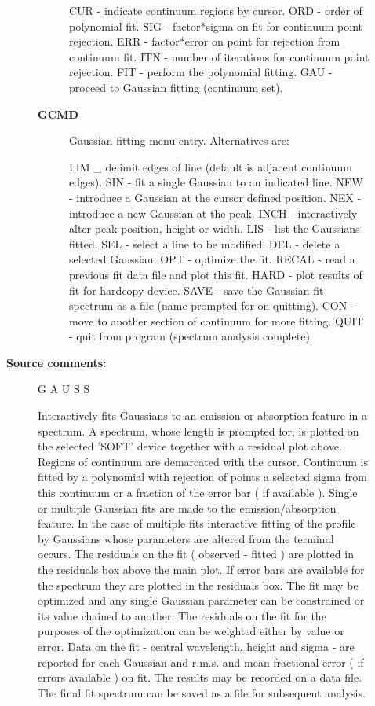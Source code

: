 \begin{description}
\begin{description}
\begin{description}
    CUR - indicate continuum regions by cursor.
    ORD - order of polynomial fit.
    SIG - factor*sigma on fit for continuum point rejection.
    ERR - factor*error on point for rejection from continuum fit.
    ITN - number of iterations for continuum point rejection.
    FIT - perform the polynomial fitting.
    GAU - proceed to Gaussian fitting (continuum set).
\item [\textbf{GCMD}]
 Gaussian fitting menu entry. Alternatives are:

    LIM   \_ delimit edges of line (default is adjacent
            continuum edges).
    SIN   - fit a single Gaussian to an indicated line.
    NEW   - introduce a Gaussian at the cursor defined
            position.
    NEX   - introduce a new Gaussian at the peak.
    INCH  - interactively alter peak position, height or
            width.
    LIS   - list the Gaussians fitted.
    SEL   - select a line to be modified.
    DEL   - delete a selected Gaussian.
    OPT   - optimize the fit.
    RECAL - read a previous fit data file and plot this fit.
    HARD  - plot results of fit for hardcopy device.
    SAVE  - save the Gaussian fit spectrum as a file (name
            prompted for on quitting).
    CON   - move to another section of continuum for more
            fitting.
    QUIT  - quit from program (spectrum analysis complete).
\end{description}

\item [\textbf{Source comments:}]
\begin{terminalv}
 G A U S S

 Interactively fits Gaussians to an emission or absorption
 feature in a spectrum. A spectrum, whose length is prompted
 for, is plotted on the selected 'SOFT' device together with a
 residual plot above. Regions of continuum are demarcated with
 the cursor. Continuum is fitted by a polynomial with rejection
 of points a selected sigma from this continuum or a fraction
 of the error bar ( if available ). Single or multiple Gaussian
 fits are made to the emission/absorption feature. In the case
 of multiple fits interactive fitting of the profile by Gaussians
 whose parameters are altered from the terminal occurs. The
 residuals on the fit ( observed - fitted ) are plotted in the
 residuals box above the main plot. If error bars are available
 for the spectrum they are plotted in the residuals box. The fit
 may be optimized and any single Gaussian parameter can be
 constrained or its value chained to another. The residuals on
 the fit for the purposes of the optimization can be weighted either
 by value or error. Data on the fit - central wavelength, height and
 sigma - are reported for each Gaussian and r.m.s. and mean
 fractional error ( if errors available ) on fit. The results may be
 recorded on a data file. The final fit spectrum can be saved as a
 file for subsequent analysis.


\end{terminalv}
\end{description}
\end{description}
